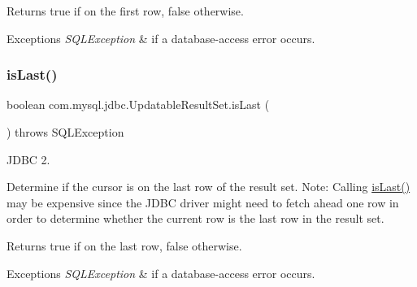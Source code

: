 \begin{DoxyReturn}{Returns}
true if on the first row, false otherwise.
\end{DoxyReturn}

\begin{DoxyExceptions}{Exceptions}
{\em S\+Q\+L\+Exception} & if a database-\/access error occurs. \\
\hline
\end{DoxyExceptions}
\mbox{\label{classcom_1_1mysql_1_1jdbc_1_1_updatable_result_set_a7815394f5a1b5ab882085c2dad44279d}} 
\subsubsection{\texorpdfstring{is\+Last()}{isLast()}}
{\footnotesize\ttfamily boolean com.\+mysql.\+jdbc.\+Updatable\+Result\+Set.\+is\+Last (\begin{DoxyParamCaption}{ }\end{DoxyParamCaption}) throws S\+Q\+L\+Exception}

J\+D\+BC 2.

Determine if the cursor is on the last row of the result set. Note\+: Calling \mbox{\hyperlink{classcom_1_1mysql_1_1jdbc_1_1_updatable_result_set_a7815394f5a1b5ab882085c2dad44279d}{is\+Last()}} may be expensive since the J\+D\+BC driver might need to fetch ahead one row in order to determine whether the current row is the last row in the result set. 

\begin{DoxyReturn}{Returns}
true if on the last row, false otherwise.
\end{DoxyReturn}

\begin{DoxyExceptions}{Exceptions}
{\em S\+Q\+L\+Exception} & if a database-\/access error occurs. \\
\hline
\end{DoxyExceptions}
\mbox{\label{classcom_1_1mysql_1_1jdbc_1_1_updatable_result_set_ae4132b5cb109e8e6a2179896f09e1254}} 
